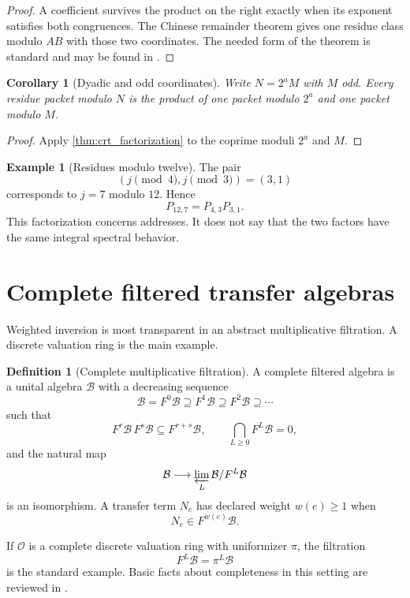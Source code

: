 \documentclass{aomart}
\newtheorem{corollary}[corollary]{Corollary}
\theoremstyle{definition}
\newtheorem{definition}[definition]{Definition}
\newtheorem{example}[example]{Example}
\theoremstyle{remark}
\newcommand{\OO}{\mathcal O}
\newcommand{\Bcal}{\mathcal B}
\begin{document}
\begin{proof}
A coefficient survives the product on the right exactly when its exponent satisfies both congruences.  The Chinese remainder theorem gives one residue class modulo $AB$ with those two coordinates.  The needed form of the theorem is standard and may be found in \cite{Lang2002}.
\end{proof}

\begin{corollary}[Dyadic and odd coordinates]\label{cor:dyadic_odd_coordinates}
Write $N=2^aM$ with $M$ odd.  Every residue packet modulo $N$ is the product of one packet modulo $2^a$ and one packet modulo $M$.
\end{corollary}

\begin{proof}
Apply \cref{thm:crt_factorization} to the coprime moduli $2^a$ and $M$.
\end{proof}

\begin{example}[Residues modulo twelve]\label{ex:mod_twelve}
The pair
\[
(j\pmod4,j\pmod3)=(3,1)
\]
corresponds to $j=7$ modulo $12$.  Hence
\[
P_{12,7}=P_{4,3}P_{3,1}.
\]
This factorization concerns addresses.  It does not say that the two factors have the same integral spectral behavior.
\end{example}

\section{Complete filtered transfer algebras}\label{sec:filtered}

Weighted inversion is most transparent in an abstract multiplicative filtration.  A discrete valuation ring is the main example.

\begin{definition}[Complete multiplicative filtration]\label{def:filtered_algebra}
A complete filtered algebra is a unital algebra $\Bcal$ with a decreasing sequence
\[
\Bcal=F^0\Bcal\supseteq F^1\Bcal\supseteq F^2\Bcal\supseteq\cdots
\]
such that
\[
F^r\Bcal\,F^s\Bcal\subseteq F^{r+s}\Bcal,
\qquad
\bigcap_{L\geq0}F^L\Bcal=0,
\]
and the natural map
\[
\Bcal\longrightarrow\varprojlim_L\Bcal/F^L\Bcal
\]
is an isomorphism.  A transfer term $N_e$ has declared weight $w(e)\geq1$ when
\[
N_e\in F^{w(e)}\Bcal.
\]
\end{definition}

If $\OO$ is a complete discrete valuation ring with uniformizer $\pi$, the filtration
\[
F^L\Bcal=\pi^L\Bcal
\]
is the standard example.  Basic facts about completeness in this setting are reviewed in \cite{Serre1979}.
\end{document}
